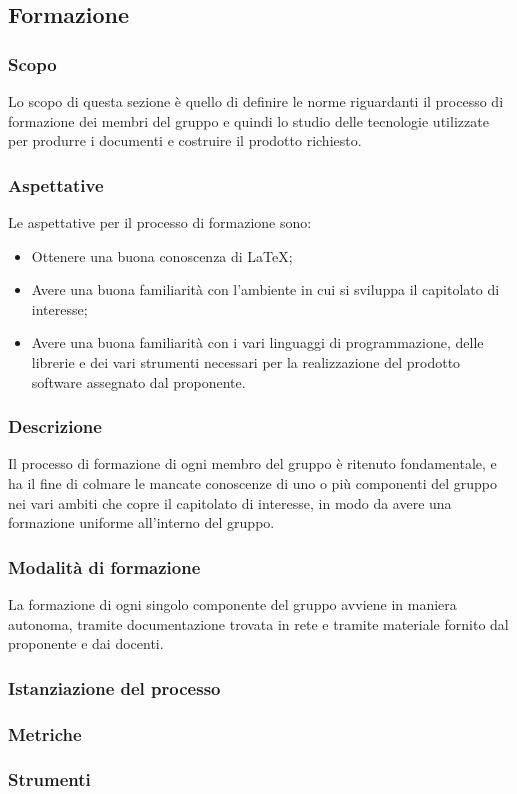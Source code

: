 \subsection{Formazione} \label{subsection: formazione}
\subsubsection {Scopo}
Lo scopo di questa sezione è quello di definire le norme riguardanti il processo di formazione dei membri del gruppo \groupName{} e quindi lo studio delle tecnologie utilizzate per produrre i documenti e costruire il prodotto richiesto.
\subsubsection {Aspettative}
Le aspettative per il processo di formazione sono:
\begin {itemize}
\item Ottenere una buona conoscenza di \LaTeX{};
\item Avere una buona familiarità con l'ambiente in cui si sviluppa il capitolato di interesse;
\item Avere una buona familiarità con i vari linguaggi di programmazione, delle librerie e dei vari strumenti necessari per la realizzazione del prodotto software assegnato dal proponente.
\end {itemize}
\subsubsection {Descrizione}
Il processo di formazione di ogni membro del gruppo \groupName{} è ritenuto fondamentale, e ha il fine di colmare le mancate conoscenze di uno o più componenti del gruppo nei vari ambiti che copre il capitolato di interesse, in modo da avere una formazione uniforme all'interno del gruppo.
\subsubsection {Modalità di formazione}
La formazione di ogni singolo componente del gruppo avviene in maniera autonoma, tramite documentazione trovata in rete e tramite materiale fornito dal proponente e dai docenti.
\subsubsection{Istanziazione del processo}
\subsubsection{Metriche}
\subsubsection{Strumenti}